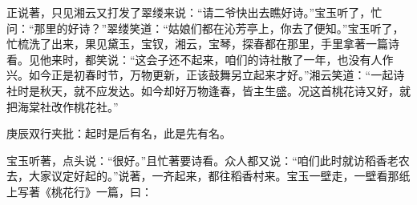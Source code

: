 \begin{parag}


    正说著，只见湘云又打发了翠缕来说：“请二爷快出去瞧好诗。”宝玉听了，忙问：“那里的好诗？”翠缕笑道：“姑娘们都在沁芳亭上，你去了便知。”宝玉听了，忙梳洗了出来，果见黛玉，宝钗，湘云，宝琴，探春都在那里，手里拿著一篇诗看。见他来时，都笑说：“这会子还不起来，咱们的诗社散了一年，也没有人作兴。如今正是初春时节，万物更新，正该鼓舞另立起来才好。”湘云笑道：“一起诗社时是秋天，就不应发达。如今却好万物逢春，皆主生盛。况这首桃花诗又好，就把海棠社改作桃花社。”\begin{note}庚辰双行夹批：起时是后有名，此是先有名。\end{note}宝玉听著，点头说：“很好。”且忙著要诗看。众人都又说：“咱们此时就访稻香老农去，大家议定好起的。”说著，一齐起来，都往稻香村来。宝玉一壁走，一壁看那纸上写著《桃花行》一篇，曰：
\end{parag}

